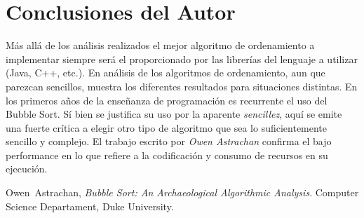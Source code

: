 \documentclass[conference]{IEEEtran}
\begin{document}
\section{Conclusiones del Autor}
\label{sec:conc}
Más allá de los análisis realizados el mejor algoritmo de ordenamiento
a implementar siempre será el proporcionado por las librerías del
lenguaje a utilizar (Java, C++, etc.). En análisis de los algoritmos
de ordenamiento, aun que parezcan sencillos, muestra los diferentes
resultados para situaciones distintas. En los primeros años de la
enseñanza de programación es recurrente el uso del Bubble Sort. Sí
bien se justifica su uso por la aparente \emph{sencillez}, aquí se
emite una fuerte crítica a elegir otro tipo de algoritmo que sea lo
suficientemente sencillo y complejo. El trabajo escrito por \emph{Owen
Astrachan} confirma el bajo performance en lo que refiere a la
codificación y consumo de recursos en su ejecución.

\begin{thebibliography}{1}
  Owen~Astrachan, \emph{Bubble Sort: An Archaeological Algorithmic
    Analysis}. Computer Science Departament, Duke University. 
\end{thebibliography}

\end{document}
